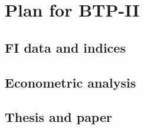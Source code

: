 \chapter{Plan for BTP-II}

\section{FI data and indices}

\section{Econometric analysis}

\section{Thesis and paper}

